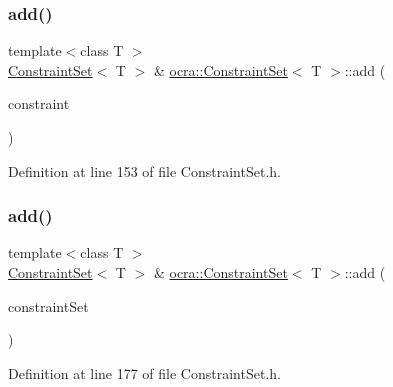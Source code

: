 \subsubsection{\texorpdfstring{add()}{add()}\hspace{0.1cm}{\footnotesize\ttfamily [1/2]}}
{\footnotesize\ttfamily template$<$class T $>$ \\
\hyperlink{classocra_1_1ConstraintSet}{Constraint\+Set}$<$ T $>$ \& \hyperlink{classocra_1_1ConstraintSet}{ocra\+::\+Constraint\+Set}$<$ T $>$\+::add (\begin{DoxyParamCaption}\item[{\hyperlink{classocra_1_1Constraint}{Constraint}$<$ T $>$ $\ast$}]{constraint }\end{DoxyParamCaption})\hspace{0.3cm}{\ttfamily [inline]}}



Definition at line 153 of file Constraint\+Set.\+h.

\hypertarget{classocra_1_1ConstraintSet_a4e0ff725278438f2f595ebc0a5de4389}{}\label{classocra_1_1ConstraintSet_a4e0ff725278438f2f595ebc0a5de4389} 
\subsubsection{\texorpdfstring{add()}{add()}\hspace{0.1cm}{\footnotesize\ttfamily [2/2]}}
{\footnotesize\ttfamily template$<$class T $>$ \\
\hyperlink{classocra_1_1ConstraintSet}{Constraint\+Set}$<$ T $>$ \& \hyperlink{classocra_1_1ConstraintSet}{ocra\+::\+Constraint\+Set}$<$ T $>$\+::add (\begin{DoxyParamCaption}\item[{\hyperlink{classocra_1_1ConstraintSet}{Constraint\+Set}$<$ T $>$ \&}]{constraint\+Set }\end{DoxyParamCaption})\hspace{0.3cm}{\ttfamily [inline]}}



Definition at line 177 of file Constraint\+Set.\+h.

\hypertarget{classocra_1_1ConstraintSet_adc4069c30e8a497d88e930d68fc1ac57}{}\label{classocra_1_1ConstraintSet_adc4069c30e8a497d88e930d68fc1ac57} 
